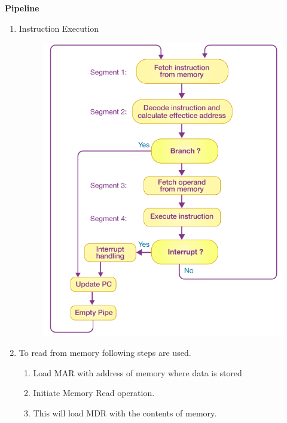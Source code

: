 
\centerline{\textbf{ \LARGE Pipeline }}

\begin{enumerate}
    \item Instruction Execution \\
        \begin{figure}[h]
            \centering   \includegraphics[scale=0.5]{./images/instruction-execution.png}
        \end{figure}

    \item To read from memory following steps are used.
    \begin{enumerate}
        \item Load MAR with address of memory where data is stored
        \item Initiate Memory Read operation.
        \item This will load MDR with the contents of memory.
    \end{enumerate}

    \newpage


\end{enumerate}
